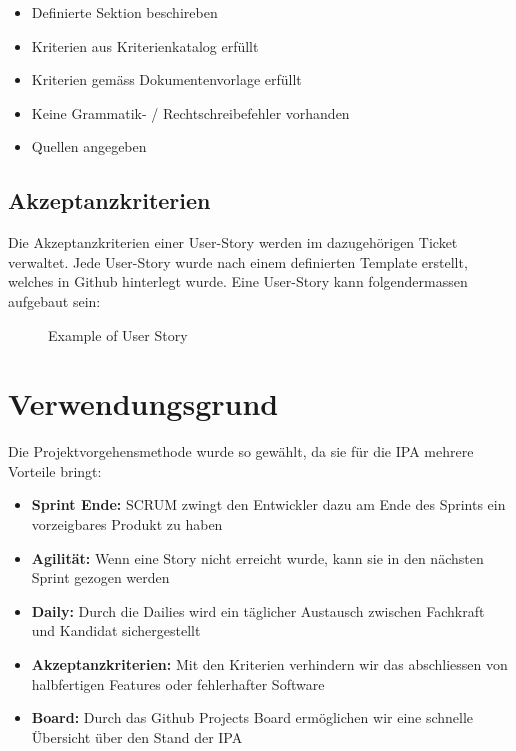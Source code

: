 \begin{itemize}
    \item Definierte Sektion beschireben
    \item Kriterien aus Kriterienkatalog erfüllt
    \item Kriterien gemäss Dokumentenvorlage erfüllt
    \item Keine Grammatik- / Rechtschreibefehler vorhanden
    \item Quellen angegeben
\end{itemize}

\subsection{Akzeptanzkriterien}
Die Akzeptanzkriterien einer User-Story werden im dazugehörigen Ticket verwaltet. Jede User-Story wurde nach einem definierten Template
erstellt, welches in Github hinterlegt wurde. Eine User-Story kann folgendermassen aufgebaut sein:

\begin{figure}[h]
    \centering
    \caption{Example of User Story}
\end{figure}

\section{Verwendungsgrund}
Die Projektvorgehensmethode wurde so gewählt, da sie für die IPA mehrere Vorteile bringt:

\begin{itemize}
    \item \textbf{Sprint Ende:} SCRUM zwingt den Entwickler dazu am Ende des Sprints ein vorzeigbares Produkt zu haben
    \item \textbf{Agilität:} Wenn eine Story nicht erreicht wurde, kann sie in den nächsten Sprint gezogen werden
    \item \textbf{Daily:} Durch die Dailies wird ein täglicher Austausch zwischen Fachkraft und Kandidat sichergestellt
    \item \textbf{Akzeptanzkriterien:} Mit den Kriterien verhindern wir das abschliessen von halbfertigen Features oder fehlerhafter Software
    \item \textbf{Board:} Durch das Github Projects Board ermöglichen wir eine schnelle Übersicht über den Stand der IPA
\end{itemize}

